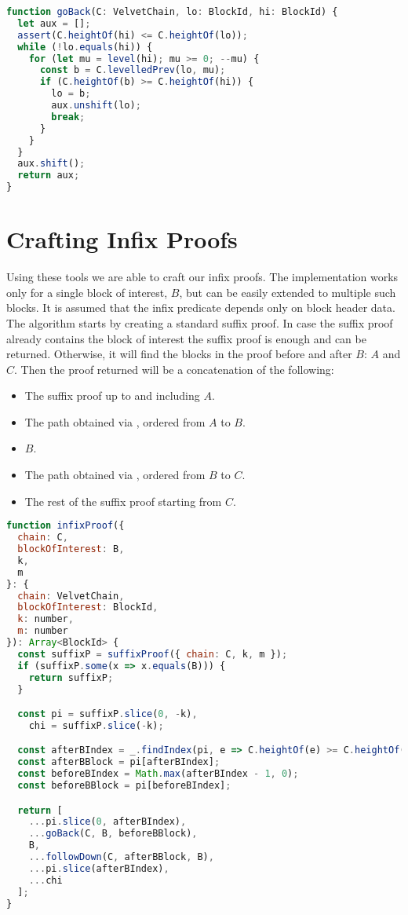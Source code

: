 
\begin{lstlisting}[language=Javascript]
function goBack(C: VelvetChain, lo: BlockId, hi: BlockId) {
  let aux = [];
  assert(C.heightOf(hi) <= C.heightOf(lo));
  while (!lo.equals(hi)) {
    for (let mu = level(hi); mu >= 0; --mu) {
      const b = C.levelledPrev(lo, mu);
      if (C.heightOf(b) >= C.heightOf(hi)) {
        lo = b;
        aux.unshift(lo);
        break;
      }
    }
  }
  aux.shift();
  return aux;
}
\end{lstlisting}

\section{Crafting Infix Proofs}
Using these tools we are able to craft our infix proofs. The implementation works only for a single block of interest, $B$, but can be easily extended to multiple such blocks. It is assumed that the infix predicate depends only on block header data. The algorithm starts by creating a standard suffix proof. In case the suffix proof already contains the block of interest the suffix proof is enough and can be returned. Otherwise, it will find the blocks in the proof before and after $B$: $A$ and $C$. Then the proof returned will be a concatenation of the following:

\begin{itemize}
  \item The suffix proof up to and including $A$.
  \item The path obtained via , ordered from $A$ to $B$.
  \item $B$.
  \item The path obtained via , ordered from $B$ to $C$.
  \item The rest of the suffix proof starting from $C$.
\end{itemize}

\begin{lstlisting}[language=Javascript]
function infixProof({
  chain: C,
  blockOfInterest: B,
  k,
  m
}: {
  chain: VelvetChain,
  blockOfInterest: BlockId,
  k: number,
  m: number
}): Array<BlockId> {
  const suffixP = suffixProof({ chain: C, k, m });
  if (suffixP.some(x => x.equals(B))) {
    return suffixP;
  }

  const pi = suffixP.slice(0, -k),
    chi = suffixP.slice(-k);

  const afterBIndex = _.findIndex(pi, e => C.heightOf(e) >= C.heightOf(B));
  const afterBBlock = pi[afterBIndex];
  const beforeBIndex = Math.max(afterBIndex - 1, 0);
  const beforeBBlock = pi[beforeBIndex];

  return [
    ...pi.slice(0, afterBIndex),
    ...goBack(C, B, beforeBBlock),
    B,
    ...followDown(C, afterBBlock, B),
    ...pi.slice(afterBIndex),
    ...chi
  ];
}
\end{lstlisting}

